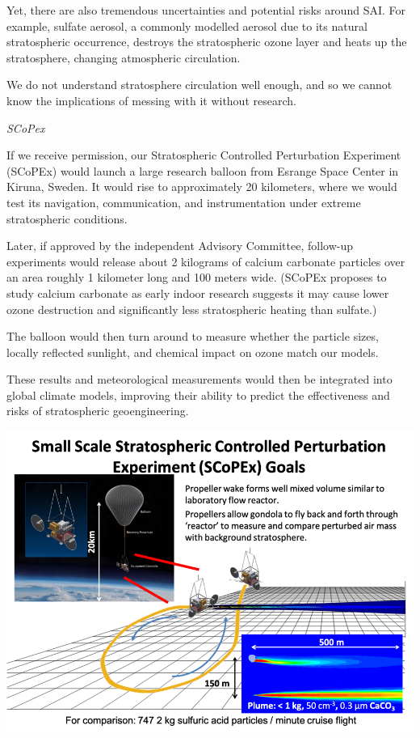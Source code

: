 \documentclass[
]{book}
\begin{document}
Yet, there are also tremendous uncertainties and potential risks around SAI. For example, sulfate aerosol, a commonly modelled aerosol due to its natural stratospheric occurrence, destroys the stratospheric ozone layer and heats up the stratosphere, changing atmospheric circulation.

We do not understand stratosphere circulation well enough, and so we cannot know the implications of messing with it without research.

\emph{SCoPex}

If we receive permission, our Stratospheric Controlled Perturbation Experiment (SCoPEx) would launch a large research balloon from Esrange Space Center in Kiruna, Sweden. It would rise to approximately 20 kilometers, where we would test its navigation, communication, and instrumentation under extreme stratospheric conditions.

Later, if approved by the independent Advisory Committee, follow-up experiments would release about 2 kilograms of calcium carbonate particles over an area roughly 1 kilometer long and 100 meters wide. (SCoPEx proposes to study calcium carbonate as early indoor research suggests it may cause lower ozone destruction and significantly less stratospheric heating than sulfate.)

The balloon would then turn around to measure whether the particle sizes, locally reflected sunlight, and chemical impact on ozone match our models.

These results and meteorological measurements would then be integrated into global climate models, improving their ability to predict the effectiveness and risks of stratospheric geoengineering.

\includegraphics{fig/Scopex-Picture.png}
\end{document}
